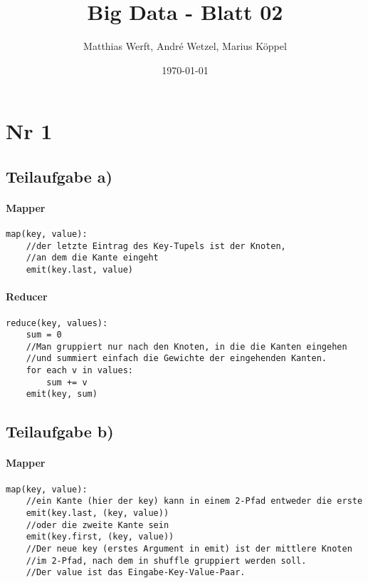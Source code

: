 \documentclass{article}
\title{Big Data - Blatt 02}
\author{Matthias Werft, André Wetzel, Marius Köppel}
\date{\today}
\begin{document}
\maketitle

\section{Nr 1}

\subsection{Teilaufgabe a)}

\paragraph{Mapper}
\begin{lstlisting}
map(key, value):
	//der letzte Eintrag des Key-Tupels ist der Knoten,
	//an dem die Kante eingeht
	emit(key.last, value)
\end{lstlisting}

\paragraph{Reducer}
\begin{lstlisting}
reduce(key, values):
	sum = 0
	//Man gruppiert nur nach den Knoten, in die die Kanten eingehen
	//und summiert einfach die Gewichte der eingehenden Kanten.
	for each v in values:
		sum += v
	emit(key, sum)
\end{lstlisting}

\subsection{Teilaufgabe b)}

\paragraph{Mapper}
\begin{lstlisting}
map(key, value):
	//ein Kante (hier der key) kann in einem 2-Pfad entweder die erste
	emit(key.last, (key, value))
	//oder die zweite Kante sein
	emit(key.first, (key, value))
	//Der neue key (erstes Argument in emit) ist der mittlere Knoten
	//im 2-Pfad, nach dem in shuffle gruppiert werden soll.
	//Der value ist das Eingabe-Key-Value-Paar.
\end{lstlisting}

\newpage
\end{document}

